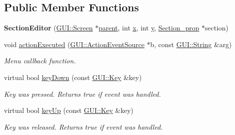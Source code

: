 \subsection*{Public Member Functions}
\begin{DoxyCompactItemize}
\item 
\hypertarget{classSectionEditor_a5b4b01aaafcd5cb87b20e5aa7cab7f87}{{\bfseries Section\-Editor} (\hyperlink{classGUI_1_1Screen}{G\-U\-I\-::\-Screen} $\ast$\hyperlink{classGUI_1_1Window_a2e593ff65e7702178d82fe9010a0b539}{parent}, int \hyperlink{classGUI_1_1Window_a6ca6a80ca00c9e1d8ceea8d3d99a657d}{x}, int \hyperlink{classGUI_1_1Window_a0ee8e923aff2c3661fc2e17656d37adf}{y}, \hyperlink{classSection__prop}{Section\-\_\-prop} $\ast$section)}\label{classSectionEditor_a5b4b01aaafcd5cb87b20e5aa7cab7f87}

\item 
\hypertarget{classSectionEditor_affef3df8632e3d7cef272a5cbcd4728f}{void \hyperlink{classSectionEditor_affef3df8632e3d7cef272a5cbcd4728f}{action\-Executed} (\hyperlink{classGUI_1_1ActionEventSource}{G\-U\-I\-::\-Action\-Event\-Source} $\ast$b, const \hyperlink{classGUI_1_1String}{G\-U\-I\-::\-String} \&arg)}\label{classSectionEditor_affef3df8632e3d7cef272a5cbcd4728f}

\begin{DoxyCompactList}\small\item\em Menu callback function. \end{DoxyCompactList}\item 
\hypertarget{classSectionEditor_a388717da370a6b61c5500d7ec776ed11}{virtual bool \hyperlink{classSectionEditor_a388717da370a6b61c5500d7ec776ed11}{key\-Down} (const \hyperlink{classGUI_1_1Key}{G\-U\-I\-::\-Key} \&key)}\label{classSectionEditor_a388717da370a6b61c5500d7ec776ed11}

\begin{DoxyCompactList}\small\item\em Key was pressed. Returns true if event was handled. \end{DoxyCompactList}\item 
\hypertarget{classSectionEditor_a6e29953b0bc66bb98a6ab8f254000720}{virtual bool \hyperlink{classSectionEditor_a6e29953b0bc66bb98a6ab8f254000720}{key\-Up} (const \hyperlink{classGUI_1_1Key}{G\-U\-I\-::\-Key} \&key)}\label{classSectionEditor_a6e29953b0bc66bb98a6ab8f254000720}

\begin{DoxyCompactList}\small\item\em Key was released. Returns true if event was handled. \end{DoxyCompactList}\end{DoxyCompactItemize}
